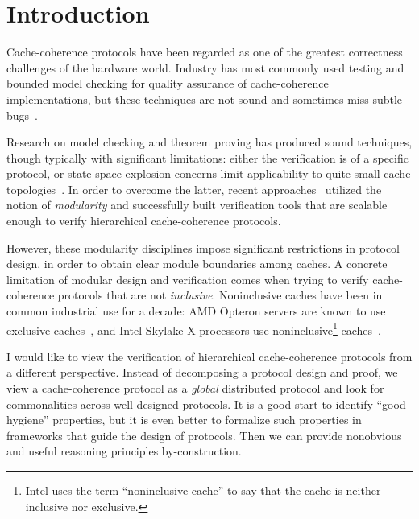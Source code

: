 \newcommand{\amsgi}[1]{\ensuremath{#1^{\textrm{init}}}}
\newcommand{\amsge}[1]{\ensuremath{#1^{\textrm{end}}}}

\newcommand{\hseq}[2]{\ensuremath{#1 \parallel #2}}
\newcommand{\hsrzl}[2]{\ensuremath{\mathit{Serializable}\ #1\ #2}}
\newcommand{\hsrz}[1]{\ensuremath{\mathit{Serializable}\ #1}}

\newcommand{\strsn}[2]{\ensuremath{#1 \sswarrow_{s} #2}}
\newcommand{\hsseq}[3]{\ensuremath{#1 \parallel_{#3} #2}}


\section{Introduction}\label{sec-intro}

Cache-coherence protocols have been regarded as one of the greatest correctness challenges of the hardware world.
Industry has most commonly used testing and bounded model checking for quality assurance of cache-coherence implementations, but these techniques are not sound and sometimes miss subtle bugs~\cite{ccbug}.

Research on model checking and theorem proving has produced sound techniques, though typically with significant limitations:
either the verification is of a specific protocol, or state-space-explosion concerns limit applicability to quite small cache topologies~\cite{Komuravelli:2014,Murali:2015,Banks:2017,Oswald:2018}.
In order to overcome the latter, recent approaches~\cite{Chen:2008,Chen:2010,McMillan:2016,Opeoluwa:2016,Opeoluwa:2017,Oswald:2020} utilized the notion of \emph{modularity} and successfully built verification tools that are scalable enough to verify hierarchical cache-coherence protocols.

However, these modularity disciplines impose significant restrictions in protocol design, in order to obtain clear module boundaries among caches.
A concrete limitation of modular design and verification comes when trying to verify cache-coherence protocols that are not \emph{inclusive}.
Noninclusive caches have been in common industrial use for a decade: AMD Opteron servers are known to use exclusive caches~\cite{Irazoqui:2016}, and Intel Skylake-X processors use noninclusive\footnote{Intel uses the term ``noninclusive cache'' to say that the cache is neither inclusive nor exclusive.} caches~\cite{intel-non-inclusive,Zhao:2010,Yan:2019}.

I would like to view the verification of hierarchical cache-coherence protocols from a different perspective.
Instead of decomposing a protocol design and proof, we view a cache-coherence protocol as a \emph{global} distributed protocol and look for commonalities across well-designed protocols.
It is a good start to identify ``good-hygiene'' properties, but it is even better to formalize such properties in frameworks that guide the design of protocols.
Then we can provide nonobvious and useful reasoning principles by-construction.

